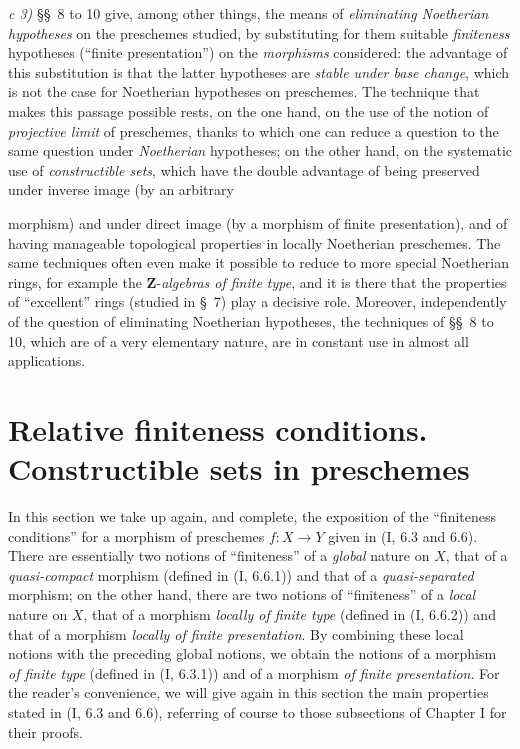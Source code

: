 \medskip
\noindent
\emph{c 3)} §§~8 to 10 give, among other things, the means of
\emph{eliminating Noetherian hypotheses} on the preschemes studied, by
substituting for them suitable \emph{finiteness} hypotheses (``finite
presentation'') on the \emph{morphisms} considered: the advantage of this
substitution is that the latter hypotheses are \emph{stable under base
change}, which is not the case for Noetherian hypotheses on preschemes. The
technique that makes this passage possible rests, on the one hand, on the use
of the notion of \emph{projective limit} of preschemes, thanks to which one
can reduce a question to the same question under \emph{Noetherian}
hypotheses; on the other hand, on the systematic use of
\emph{constructible sets}, which have the double advantage of being preserved
under inverse image (by an arbitrary


morphism) and under direct image (by a morphism of finite presentation), and
of having manageable topological properties in locally Noetherian
preschemes. The same techniques often even make it possible to reduce to
more special Noetherian rings, for example the
$\mathbf Z$-\emph{algebras of finite type}, and it is there that the
properties of ``excellent'' rings (studied in §~7) play a decisive role.
Moreover, independently of the question of eliminating Noetherian
hypotheses, the techniques of §§~8 to 10, which are of a very elementary
nature, are in constant use in almost all applications.

\setcounter{section}{0}


\section{Relative finiteness conditions. Constructible sets in preschemes}
\label{section:IV.1}

In this section we take up again, and complete, the exposition of the
``finiteness conditions'' for a morphism of preschemes $f:X\to Y$ given
in (I, 6.3 and 6.6). There are essentially two notions of ``finiteness'' of
a \emph{global} nature on $X$, that of a \emph{quasi-compact} morphism
(defined in (I, 6.6.1)) and that of a \emph{quasi-separated} morphism; on
the other hand, there are two notions of ``finiteness'' of a \emph{local}
nature on $X$, that of a morphism \emph{locally of finite type} (defined in
(I, 6.6.2)) and that of a morphism \emph{locally of finite presentation}. By
combining these local notions with the preceding global notions, we obtain
the notions of a morphism \emph{of finite type} (defined in (I, 6.3.1)) and
of a morphism \emph{of finite presentation}. For the reader's convenience,
we will give again in this section the main properties stated in (I, 6.3
and 6.6), referring of course to those subsections of Chapter I for their
proofs.

